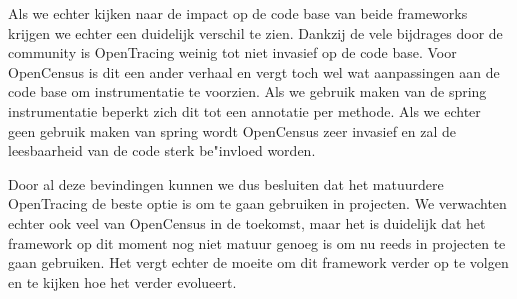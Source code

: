 Als we echter kijken naar de impact op de code base van beide frameworks krijgen we echter een duidelijk verschil te zien. Dankzij de vele bijdrages door de community is OpenTracing weinig tot niet invasief op de code base. Voor OpenCensus is dit een ander verhaal en vergt toch wel wat aanpassingen aan de code base om instrumentatie te voorzien. Als we gebruik maken van de spring instrumentatie beperkt zich dit tot een annotatie per methode. Als we echter geen gebruik maken van spring wordt OpenCensus zeer invasief en zal de leesbaarheid van de code sterk be"invloed worden.

Door al deze bevindingen kunnen we dus besluiten dat het matuurdere OpenTracing de beste optie is om te gaan gebruiken in projecten. We verwachten echter ook veel van OpenCensus in de toekomst, maar het is duidelijk dat het framework op dit moment nog niet matuur genoeg is om nu reeds in projecten te gaan gebruiken. Het vergt echter de moeite om dit framework verder op te volgen en te kijken hoe het verder evolueert.